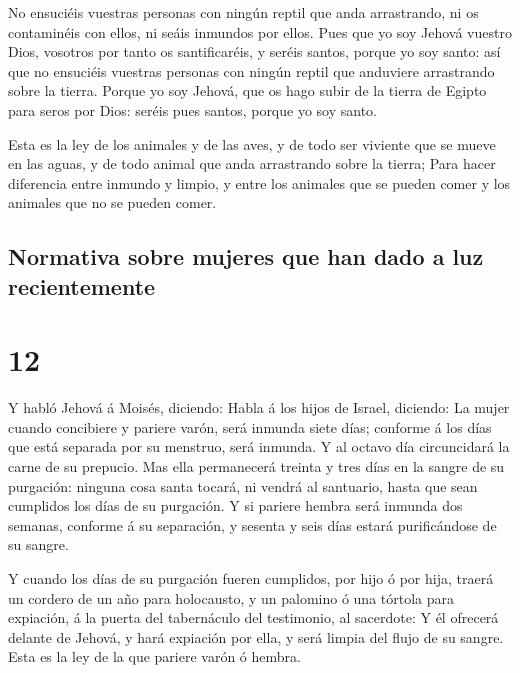 No ensuciéis vuestras personas con ningún reptil que anda
arrastrando, ni os contaminéis con ellos, ni seáis inmundos por ellos.
 Pues que yo soy Jehová vuestro Dios, vosotros por tanto os
santificaréis, y seréis santos, porque yo soy santo: así que no
ensuciéis vuestras personas con ningún reptil que anduviere arrastrando
sobre la tierra.  Porque yo soy Jehová, que os hago subir
de la tierra de Egipto para seros por Dios: seréis pues santos, porque
yo soy santo.

 Esta es la ley de los animales y de las aves, y de todo
ser viviente que se mueve en las aguas, y de todo animal que anda
arrastrando sobre la tierra;  Para hacer diferencia entre
inmundo y limpio, y entre los animales que se pueden comer y los
animales que no se pueden comer.

\hypertarget{normativa-sobre-mujeres-que-han-dado-a-luz-recientemente}{%
\subsection{Normativa sobre mujeres que han dado a luz
recientemente}\label{normativa-sobre-mujeres-que-han-dado-a-luz-recientemente}}

\hypertarget{section-11}{%
\section{12}\label{section-11}}

 Y habló Jehová á Moisés, diciendo:  Habla á los
hijos de Israel, diciendo: La mujer cuando concibiere y pariere varón,
será inmunda siete días; conforme á los días que está separada por su
menstruo, será inmunda.  Y al octavo día circuncidará la
carne de su prepucio.  Mas ella permanecerá treinta y tres
días en la sangre de su purgación: ninguna cosa santa tocará, ni vendrá
al santuario, hasta que sean cumplidos los días de su purgación.
 Y si pariere hembra será inmunda dos semanas, conforme á su
separación, y sesenta y seis días estará purificándose de su sangre.

 Y cuando los días de su purgación fueren cumplidos, por
hijo ó por hija, traerá un cordero de un año para holocausto, y un
palomino ó una tórtola para expiación, á la puerta del tabernáculo del
testimonio, al sacerdote:  Y él ofrecerá delante de Jehová,
y hará expiación por ella, y será limpia del flujo de su sangre. Esta es
la ley de la que pariere varón ó hembra.

